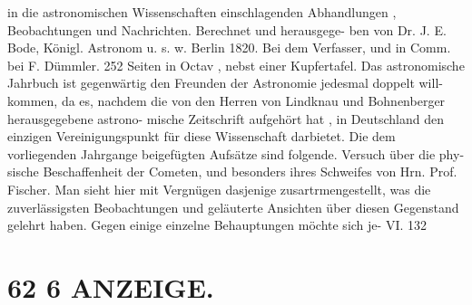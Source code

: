 \documentclass[12pt,a4paper]{article}
\begin{document}
{{{{{{{{in  die  astronomischen Wissenschaften  einschlagenden  Abhandlungen ,  Beobachtungen  und  Nachrichten.  Berechnet  und  herausgege- ben von  Dr.  J.  E.  Bode,  Königl.  Astronom  u.  s. w.  Berlin  1820.  Bei  dem  Verfasser,  und  in  Comm.  bei F.  Dümmler.     252  Seiten  in  Octav ,  nebst  einer  Kupfertafel. Das  astronomische  Jahrbuch  ist  gegenwärtig  den  Freunden  der  Astronomie  jedesmal  doppelt  will- kommen, da  es,  nachdem  die  von  den  Herren  von  Lindknau  und  Bohnenberger  herausgegebene  astrono- mische Zeitschrift  aufgehört  hat ,  in  Deutschland  den  einzigen  Vereinigungspunkt  für  diese  Wissenschaft darbietet.  Die  dem  vorliegenden  Jahrgange  beigefügten  Aufsätze  sind  folgende.  Versuch  über  die  phy- sische Beschaffenheit  der  Cometen,  und  besonders  ihres  Schweifes  von  Hrn.  Prof.  Fischer.  Man  sieht hier  mit  Vergnügen  dasjenige  zusartrmengestellt,  was  die  zuverlässigsten  Beobachtungen  und  geläuterte Ansichten  über  diesen  Gegenstand  gelehrt  haben.     Gegen  einige  einzelne  Behauptungen  möchte  sich  je- VI. 132


\section*{62  6  ANZEIGE.}

}}}}}}}}
\end{document}
